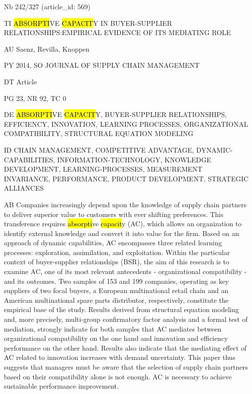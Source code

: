 \documentclass[a4paper]{article}
\begin{document}
\vspace*{-2cm}
Nb \tabto{0cm}242/327 (article\_id: 569)\par
TI \tabto{0cm}\hl{ABSORPTI}VE \hl{CAPACIT}Y IN BUYER-SUPPLIER RELATIONSHIPS:EMPIRICAL EVIDENCE OF ITS MEDIATING ROLE\par
AU \tabto{0cm}Saenz, Revilla, Knoppen\par
PY \tabto{0cm}2014, SO JOURNAL OF SUPPLY CHAIN MANAGEMENT\par
DT \tabto{0cm}Article\par
PG \tabto{0cm}23, NR 92, TC 0\par
DE \tabto{0cm}\hl{ABSORPTI}VE \hl{CAPACIT}Y, BUYER-SUPPLIER RELATIONSHIPS, EFFICIENCY, INNOVATION, LEARNING PROCESSES, ORGANIZATIONAL COMPATIBILITY, STRUCTURAL EQUATION MODELING\par
ID \tabto{0cm}CHAIN MANAGEMENT, COMPETITIVE ADVANTAGE, DYNAMIC-CAPABILITIES, INFORMATION-TECHNOLOGY, KNOWLEDGE DEVELOPMENT, LEARNING-PROCESSES, MEASUREMENT INVARIANCE, PERFORMANCE, PRODUCT DEVELOPMENT, STRATEGIC ALLIANCES\par
AB \tabto{0cm}Companies increasingly depend upon the knowledge of supply chain partners to deliver superior value to customers with ever shifting preferences. This transference requires \hl{absorpti}ve \hl{capacit}y (AC), which allows an organization to identify external knowledge and convert it into value for the firm. Based on an approach of dynamic capabilities, AC encompasses three related learning processes: exploration, assimilation, and exploitation. Within the particular context of buyer-supplier relationships (BSR), the aim of this research is to examine AC, one of its most relevant antecedents - organizational compatibility - and its outcomes. Two samples of 153 and 199 companies, operating as key suppliers of two focal buyers, a European multinational retail chain and an American multinational spare parts distributor, respectively, constitute the empirical base of the study. Results derived from structural equation modeling and, more precisely, multi-group confirmatory factor analysis and a formal test of mediation, strongly indicate for both samples that AC mediates between organizational compatibility on the one hand and innovation and efficiency performance on the other hand. Results also indicate that the mediating effect of AC related to innovation increases with demand uncertainty. This paper thus suggests that managers must be aware that the selection of supply chain partners based on their compatibility alone is not enough. AC is necessary to achieve
sustainable performance improvement.\par
\clearpage
\end{document}
